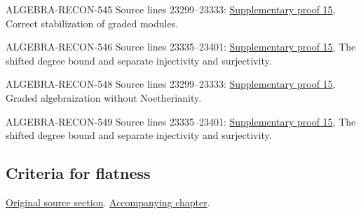 \begin{AlgebraSourceRoutes}
\item[ALGEBRA-RECON-545] Source lines 23299--23333: \hyperlink{algebra_graded_completion_notes_20260927}{Supplementary proof 15}, Correct stabilization of graded modules.
\item[ALGEBRA-RECON-546] Source lines 23335--23401: \hyperlink{algebra_graded_completion_notes_20260927}{Supplementary proof 15}, The shifted degree bound and separate injectivity and surjectivity.
\item[ALGEBRA-RECON-548] Source lines 23299--23333: \hyperlink{algebra_graded_completion_notes_20260927}{Supplementary proof 15}, Graded algebraization without Noetherianity.
\item[ALGEBRA-RECON-549] Source lines 23335--23401: \hyperlink{algebra_graded_completion_notes_20260927}{Supplementary proof 15}, The shifted degree bound and separate injectivity and surjectivity.
\end{AlgebraSourceRoutes}

\subsection{Criteria for flatness}
\hypertarget{algebra-source-section-criteria-flatness}{}
\noindent\href{https://github.com/stacks/stacks-project/blob/a04446e57ec1fbc252a871afcec7752fb2807b14/algebra.tex\#L23415}{Original source section}. \href{algebra.pdf\#nameddest=section-criteria-flatness}{Accompanying chapter}.

